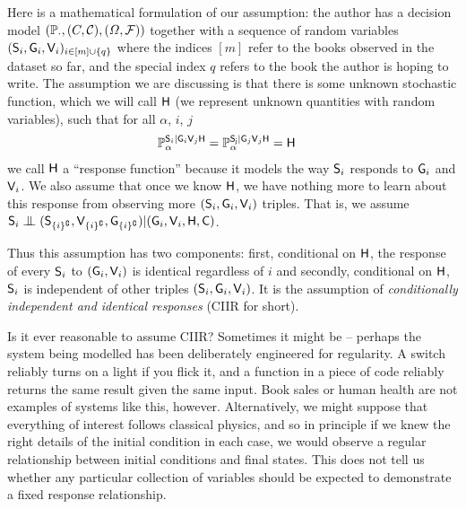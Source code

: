 Here is a mathematical formulation of our assumption: the author has a decision model $(\mathbb{P}_{\cdot}, (C,\mathcal{C}), (\Omega,\mathcal{F}))$ together with a sequence of random variables $(\mathsf{S}_i, \mathsf{G}_i, \mathsf{V}_i)_{i\in [m]\cup \{q\}}$ where the indices $[m]$ refer to the books observed in the dataset so far, and the special index $q$ refers to the book the author is hoping to write. The assumption we are discussing is that there is some unknown stochastic function, which we will call $\mathsf{H}$ (we represent unknown quantities with random variables), such that for all $\alpha$, $i$, $j$
\begin{align}
    \mathbb{P}_\alpha^{\mathsf{S}_i|\mathsf{G}_i\mathsf{V}_j\mathsf{H}} &= \mathbb{P}_\alpha^{\mathsf{S_j}|\mathsf{G}_j\mathsf{V}_j\mathsf{H}} = \mathsf{H}
\end{align}
we call $\mathsf{H}$ a ``response function'' because it models the way $\mathsf{S}_i$ responds to $\mathsf{G}_i$ and $\mathsf{V}_i$. We also assume that once we know $\mathsf{H}$, we have nothing more to learn about this response from observing more $(\mathsf{S}_i, \mathsf{G}_i, \mathsf{V}_i)$ triples. That is, we assume $\RV{S}_i \CI (\RV{S}_{\{i\}^\complement}, \RV{V}_{\{i\}^\complement}, \RV{G}_{\{i\}^\complement}) | (\RV{G}_i, \RV{V}_i, \RV{H}, \RV{C})$.

Thus this assumption has two components: first, conditional on $\mathsf{H}$, the response of every $\mathsf{S}_i$ to $(\mathsf{G}_i, \mathsf{V}_i)$ is identical regardless of $i$ and secondly, conditional on $\mathsf{H}$, $\mathsf{S}_i$ is independent of other triples $(\mathsf{S}_i, \mathsf{G}_i, \mathsf{V}_i)$. It is the assumption of \emph{conditionally independent and identical responses} (CIIR for short).

Is it ever reasonable to assume CIIR? Sometimes it might be -- perhaps the system being modelled has been deliberately engineered for regularity. A switch reliably turns on a light if you flick it, and a function in a piece of code reliably returns the same result given the same input. Book sales or human health are not examples of systems like this, however. Alternatively, we might suppose that everything of interest follows classical physics, and so in principle if we knew the right details of the initial condition in each case, we would observe a regular relationship between initial conditions and final states. This does not tell us whether any particular collection of variables should be expected to demonstrate a fixed response relationship.

